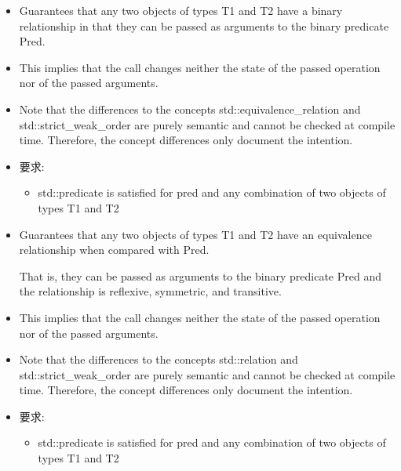 
\begin{itemize}
\item
Guarantees that any two objects of types T1 and T2 have a binary relationship in that they can be passed as arguments to the binary predicate Pred.

\item
This implies that the call changes neither the state of the passed operation nor of the passed arguments.

\item
Note that the differences to the concepts std::equivalence\_relation and std::strict\_weak\_order are purely semantic and cannot be checked at compile time. Therefore, the concept differences only document the intention.

\item
要求:
\begin{itemize}
\item
std::predicate is satisfied for pred and any combination of two objects of types T1 and T2
\end{itemize}
\end{itemize}


\begin{itemize}
\item
Guarantees that any two objects of types T1 and T2 have an equivalence relationship when compared with Pred.

That is, they can be passed as arguments to the binary predicate Pred and the relationship is reflexive, symmetric, and transitive.

\item
This implies that the call changes neither the state of the passed operation nor of the passed arguments.

\item
Note that the differences to the concepts std::relation and std::strict\_weak\_order are purely semantic and cannot be checked at compile time. Therefore, the concept differences only document the intention.

\item
要求:
\begin{itemize}
\item
std::predicate is satisfied for pred and any combination of two objects of types T1 and T2
\end{itemize}
\end{itemize}

